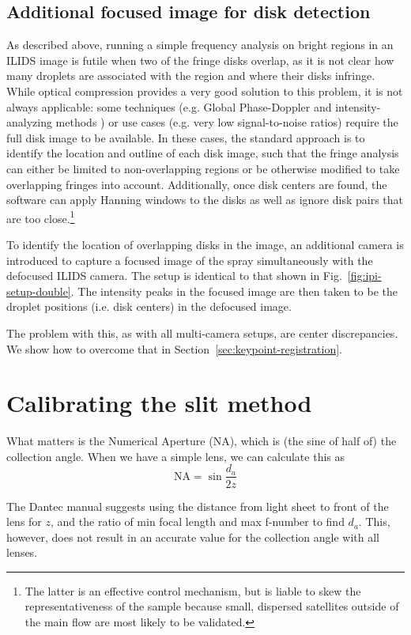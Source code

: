 \documentclass[11.5pt,oneside]{book}
\newcommand*{\figref}[1]{Fig.~\ref{#1}}
\newcommand*{\secref}[1]{Section~\ref{#1}}
\begin{document}
\subsection{Additional focused image for disk detection}
As described above, running a simple frequency analysis on bright regions in an
ILIDS image is futile when two of the fringe disks overlap, as it is not clear
how many droplets are associated with the region and where their disks infringe.
While optical compression provides a very good solution to this problem, it is
not always applicable: some techniques (e.g. Global
Phase-Doppler \cite{Damaschke01} and intensity-analyzing methods \cite{Querel10})
or use cases (e.g. very low signal-to-noise ratios) require the full disk image
to be available. In these cases, the standard approach is to identify the
location and outline of each disk image, such that the fringe analysis can
either be limited to non-overlapping regions or be otherwise modified to take
overlapping fringes into account. Additionally, once disk centers are found, the
software can apply Hanning windows to the disks as well as ignore disk pairs
that are too close.\footnote{The latter is an effective control mechanism, but
    is liable to skew the representativeness of the sample because small,
dispersed satellites outside of the main flow are most likely to be validated.}

To identify the location of overlapping disks in the image, an additional camera
is introduced to capture a focused image of the spray simultaneously with the
defocused ILIDS camera. The setup is identical to that shown in
\figref{fig:ipi-setup-double}. The intensity peaks in the focused image are then taken
to be the droplet positions (i.e. disk centers) in the defocused image.

The problem with this, as with all multi-camera setups, are center
discrepancies. We show how to overcome that in
\secref{sec:keypoint-registration}.

\section{Calibrating the slit method}
What matters is the Numerical Aperture (NA), which is (the sine of half of) the
collection angle. When we have a simple lens, we can calculate this as
\begin{equation}
    \mathrm{NA} = \sin \frac{d_a}{2z}
\end{equation}

The Dantec manual suggests using the distance from light sheet to front of the
lens for $z$, and the ratio of min focal length and max f-number to find $d_a$.
This, however, does not result in an accurate value for the collection angle
with all lenses.
\end{document}
